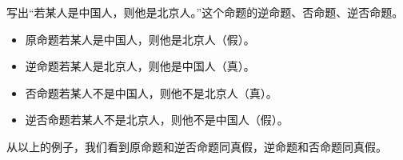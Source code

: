 \begin{example}
    写出“若某人是中国人，则他是北京人。”这个命题的逆命题、否命题、逆否命题。

\begin{itemize}
    \item 原命题\quad 若某人是中国人，则他是北京人（假）。
    \item 逆命题\quad 若某人是北京人，则他是中国人（真）。
    \item 否命题\quad 若某人不是中国人，则他不是北京人（真）。
    \item 逆否命题\quad 若某人不是北京人，则他不是中国人（假）。
\end{itemize}
\end{example}

从以上的例子，我们看到原命题和逆否命题同真假，逆命题和否命题同真假。










